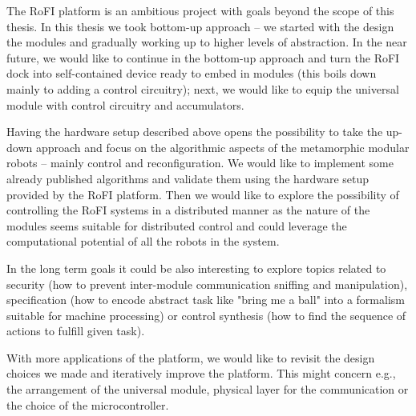 The RoFI platform is an ambitious project with goals beyond the scope of this
thesis. In this thesis we took bottom-up approach -- we started with the design
the modules and gradually working up to higher levels of abstraction. In the
near future, we would like to continue in the bottom-up approach and turn the
RoFI dock into self-contained device ready to embed in modules (this boils down
mainly to adding a control circuitry); next, we would like to equip the
universal module with control circuitry and accumulators.

Having the hardware setup described above opens the possibility to take the
up-down approach and focus on the algorithmic aspects of the metamorphic modular
robots -- mainly control and reconfiguration. We would like to implement some
already published algorithms and validate them using the hardware setup provided
by the RoFI platform. Then we would like to explore the possibility of
controlling the RoFI systems in a distributed manner as the nature of the
modules seems suitable for distributed control and could leverage the
computational potential of all the robots in the system.

In the long term goals it could be also interesting to explore topics related to
security (how to prevent inter-module communication sniffing and manipulation),
specification (how to encode abstract task like "bring me a ball" into a
formalism suitable for machine processing) or control synthesis (how to find
the sequence of actions to fulfill given task).

With more applications of the platform, we would like to revisit the design
choices we made and iteratively improve the platform. This might concern e.g.,
the arrangement of the universal module, physical layer for the communication or
the choice of the microcontroller.